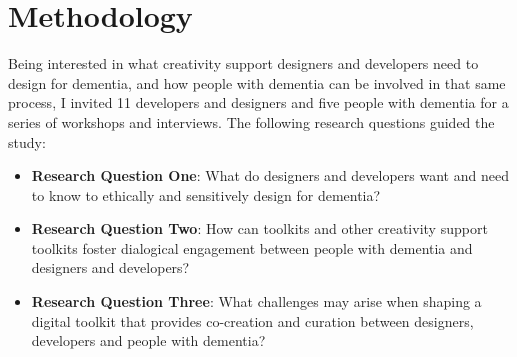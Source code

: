 

\renewcommand{\arraystretch}{1.4}


\section{Methodology}
\label{D3:Methodology}
Being interested in what creativity support designers and developers need to design for dementia, and how people with dementia can be involved in that same process, I invited 11 developers and designers and five people with dementia for a series of workshops and interviews. The following research questions guided the study:
\begin{itemize}
    \item \textbf{Research Question One}: What do designers and developers want and need to know to ethically and sensitively design for dementia?
    \item \textbf{Research Question Two}: How can toolkits and other creativity support toolkits foster dialogical engagement between people with dementia and designers and developers?
    \item \textbf{Research Question Three}: What challenges may arise when shaping a digital toolkit that provides co-creation and curation between designers, developers and people with dementia?
\end{itemize}

